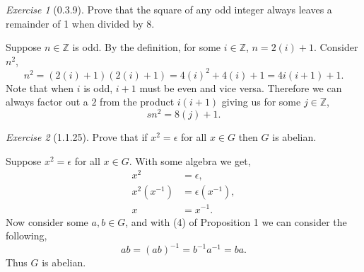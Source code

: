 \documentclass[12pt]{amsart}
\makeatletter
\theoremstyle{remark}
\newtheorem*{exercise}{Exercise}%
\def\ZZ{\ensuremath{\mathbb Z}}
\renewenvironment{proof}[1][\proofname]{\par\doublespacing
  \pushQED{\qed}%
  \normalfont \topsep6\p@\@plus6\p@\relax
  \list{}{%
    \settowidth{\leftmargin}{\itshape\proofname:\hskip\labelsep}%
    \setlength{\labelwidth}{0pt}%
    \setlength{\itemindent}{-\leftmargin}%
  }%
  \item[\hskip\labelsep\itshape#1\@addpunct{:}]\ignorespaces
}{%
  \popQED\endlist\@endpefalse
  \singlespacing
}
\theoremstyle{mycomment}
\makeatother
\begin{document}
\begin{exercise}[0.3.9]Prove that the square of any odd integer always leaves a remainder of 1 when divided by 8.
    \begin{proof} Suppose $n \in \ZZ$ is odd. By the definition, for some $i \in \ZZ$, $n = 2(i) + 1$.
      Consider $n^2$,
      \begin{equation*}
        n^2 = (2(i) + 1)(2(i) + 1) = 4(i)^2 + 4(i) + 1 = 4i(i + 1) + 1.
      \end{equation*}
      Note that when $i$ is odd, $i + 1$ must be even and vice versa. Therefore we can always factor out a $2$ from the product $i(i + 1)$ giving us
      for some $j \in \ZZ$, 
      \begin{equation*}s
        n^2 = 8(j) + 1.
      \end{equation*}
    \end{proof}
  \end{exercise}
  
    


\begin{exercise}[1.1.25] Prove that if $x^2 = \epsilon$ for all $x \in G$ then $G$ is abelian. 
    \begin{proof} Suppose $x^2 = \epsilon$ for all $x \in G$. With some algebra we get, 
      \begin{align*}
        x^2 &= \epsilon,\\
        x^2(x^{-1}) &= \epsilon(x^{-1}),\\
        x&= x^{-1}.
      \end{align*}
      Now consider some $a, b \in G$, and with (4) of Proposition 1 we can consider the following, 
      \begin{equation*}
        ab = (ab)^{-1} = b^{-1}a^{-1} = ba.  
      \end{equation*}
      Thus $G$ is abelian. 
    \end{proof}
  \end{exercise}
      
\end{document}
